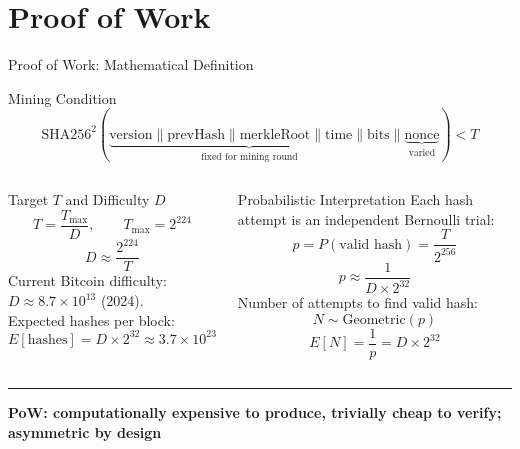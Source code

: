 \documentclass[8pt,aspectratio=169]{beamer}
\newcommand{\bottomnote}[1]{\vfill\vspace{-2mm}\textcolor{mllavender2}{\rule{\textwidth}{0.4pt}}\vspace{1mm}\footnotesize\textbf{#1}}
\begin{document}
\section{Proof of Work}

\begin{frame}{Proof of Work: Mathematical Definition}
\begin{block}{Mining Condition}
\[\text{SHA256}^2(\underbrace{\text{version}\|\text{prevHash}\|\text{merkleRoot}\|\text{time}\|\text{bits}}_{\text{fixed for mining round}}\|\underbrace{\text{nonce}}_{\text{varied}}) < T\]
\end{block}
\vspace{2mm}
\begin{columns}
\begin{block}{Target $T$ and Difficulty $D$}
\[T = \frac{T_{\max}}{D}, \qquad T_{\max} = 2^{224}\]
\[D \approx \frac{2^{224}}{T}\]
Current Bitcoin difficulty: $D \approx 8.7 \times 10^{13}$ (2024).\\[4pt]
Expected hashes per block:
\[E[\text{hashes}] = D \times 2^{32} \approx 3.7 \times 10^{23}\]
\end{block}
\begin{block}{Probabilistic Interpretation}
Each hash attempt is an independent Bernoulli trial:
\[p = P(\text{valid hash}) = \frac{T}{2^{256}}\]
\[p \approx \frac{1}{D \times 2^{32}}\]
Number of attempts to find valid hash:
\[N \sim \text{Geometric}(p)\]
\[E[N] = \frac{1}{p} = D \times 2^{32}\]
\end{block}
\end{columns}
\bottomnote{PoW: computationally expensive to produce, trivially cheap to verify; asymmetric by design}
\end{frame}
\end{document}
